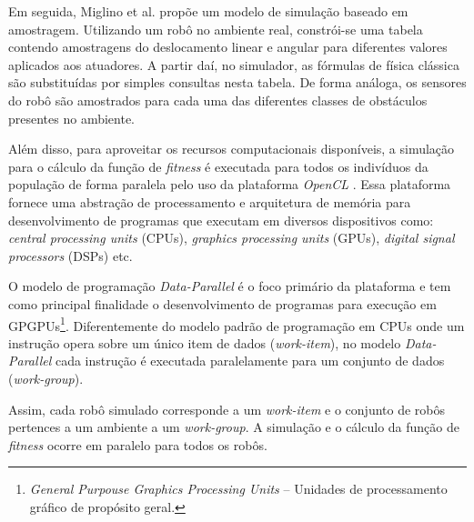 Em seguida, Miglino et al. \cite{miglino1996evolving} propõe um modelo de simulação baseado em amostragem. Utilizando um robô no ambiente real, constrói-se uma tabela contendo amostragens do deslocamento linear e angular para diferentes valores aplicados aos atuadores. A partir daí, no simulador, as fórmulas de física clássica são substituídas por simples consultas nesta tabela. De forma análoga, os sensores do robô são amostrados para cada uma das diferentes classes de obstáculos presentes no ambiente.

Além disso, para aproveitar os recursos computacionais disponíveis, a simulação para o cálculo da função de \textit{fitness} é executada para todos os indivíduos da população de forma paralela pelo uso da plataforma \textit{OpenCL} \cite{amd2012amdaccelerated}. Essa plataforma fornece uma abstração de processamento e arquitetura de memória para desenvolvimento de programas que executam em diversos dispositivos como: \textit{central processing units} (CPUs), \textit{graphics processing units} (GPUs), \textit{digital signal processors} (DSPs) etc.

O modelo de programação \textit{Data-Parallel} é o foco primário da plataforma e tem como principal finalidade o desenvolvimento de programas para execução em GPGPUs\footnote{\textit{General Purpouse Graphics Processing Units} -- Unidades de processamento gráfico de propósito geral.}. Diferentemente do modelo padrão de programação em CPUs onde um instrução opera sobre um único item de dados (\textit{work-item}), no modelo \textit{Data-Parallel} cada instrução é executada paralelamente para um conjunto de dados (\textit{work-group}).

Assim, cada robô simulado corresponde a um \textit{work-item} e o conjunto de robôs pertences a um ambiente a um \textit{work-group}. A simulação e o cálculo da função de \textit{fitness} ocorre em paralelo para todos os robôs.